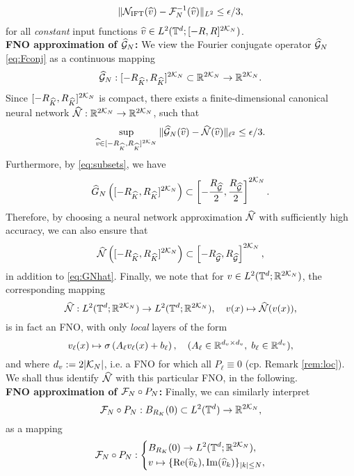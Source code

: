 \documentclass[reqno,a4paper]{amsart}
\begin{document}
\begin{align} \label{eq:Gift}
\Vert \mathcal{N}_{\mathrm{IFT}}(\widehat{v}) - \mathcal{F}_N^{-1}(\widehat{v}) \Vert_{L^2}
\le
\epsilon/3,
\end{align}
for all \emph{constant} input functions $\widehat{v} \in L^2(\mathbb{T}^d;[-R,R]^{2\mathcal{K}_N})$. \\
\textbf{FNO approximation of $\widehat{\mathcal{G}}_N$:}
We view the Fourier conjugate operator $\widehat{\mathcal{G}}_N$ \eqref{eq:Fconj} as a continuous mapping 
\[
\widehat{\mathcal{G}}_N: [-R_{\widehat{K}}, R_{\widehat{K}}]^{2\mathcal{K}_N} \subset \mathbb{R}^{2 \mathcal{K}_N} \to \mathbb{R}^{2\mathcal{K}_N}.
\]
Since $[-R_{\widehat{K}}, R_{\widehat{K}}]^{2\mathcal{K}_N}$ is compact, there exists a finite-dimensional canonical neural network $\widehat{\mathcal{N}}: \mathbb{R}^{2\mathcal{K}_N} \to \mathbb{R}^{2 \mathcal{K}_N}$, such that 
\begin{align} \label{eq:GNhat}
\sup_{\widehat{v}\in [-R_{\widehat{K}}, R_{\widehat{K}}]^{2\mathcal{K}_N}} 
\Vert 
\widehat{\mathcal{G}}_N(\widehat{v}) - \widehat{\mathcal{N}}(\widehat{v}) 
\Vert_{\ell^2}
\le \epsilon/3.
\end{align}
Furthermore, by \eqref{eq:subsets}, we have
\[
\widehat{G}_N\left(
[-R_{\widehat{K}}, R_{\widehat{K}}]^{2\mathcal{K}_N}
\right)
\subset
\left[
-\frac{R_{\widehat{\mathcal{G}}}}{2}, \frac{R_{\widehat{\mathcal{G}}}}{2}
\right]^{2\mathcal{K}_N}.
\]
Therefore, by choosing a neural network approximation $\widehat{\mathcal{N}}$ with sufficiently high accuracy, we can also ensure that
\[
\widehat{\mathcal{N}}\left(
[-R_{\widehat{K}}, R_{\widehat{K}}]^{2\mathcal{K}_N}
\right)
\subset
\left[
-{R_{\widehat{\mathcal{G}}}}, {R_{\widehat{\mathcal{G}}}}
\right]^{2\mathcal{K}_N},
\]
in addition to \eqref{eq:GNhat}. Finally, we note that for $v\in L^2(\mathbb{T}^d;\mathbb{R}^{2\mathcal{K}_N})$, the corresponding mapping
\[
\widehat{\mathcal{N}}: 
L^2(\mathbb{T}^d;\mathbb{R}^{2\mathcal{K}_N}) \to L^2(\mathbb{T}^d;\mathbb{R}^{2\mathcal{K}_N}), 
\quad
v(x) \mapsto \widehat{\mathcal{N}}(v(x)), 
\]
is in fact an FNO, with only \emph{local} layers of the form
\[
v_\ell(x) \mapsto \sigma\left(A_\ell v_\ell(x) + b_\ell \right), 
\quad
(A_\ell \in \mathbb{R}^{d_v\times d_v}, \; b_\ell \in \mathbb{R}^{d_v}),
\]
and where $d_v := 2|\mathcal{K}_N|$, i.e. a FNO for which all $P_\ell \equiv 0$ (cp. Remark \ref{rem:loc}). We shall thus identify $\widehat{\mathcal{N}}$ with this particular FNO, in the following. \\
\textbf{FNO approximation of $\mathcal{F}_N\circ P_N$:}
Finally, we can similarly interpret
\[
\mathcal{F}_N\circ P_N: B_{R_K}(0)\subset L^2(\mathbb{T}^d) \to \mathbb{R}^{2\mathcal{K}_N},
\]
as a mapping 
\begin{align} \label{eq:ft0}
\mathcal{F}_N\circ P_N:
\left\{
\begin{aligned}
&B_{R_K}(0) \to L^2(\mathbb{T}^d;\mathbb{R}^{2\mathcal{K}_N}),
\\
&v \mapsto \{\mathrm{Re}(\widehat{v}_k), \mathrm{Im}(\widehat{v}_k)\}_{|k|\le N},
\end{aligned}
\right.
\end{align}
\end{document}
